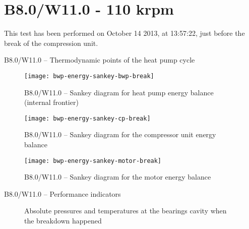 
\section{B8.0/W11.0 - 110 krpm}
\label{sec:bwp-exp-details-B8.0/W11.0}

This test has been performed on October 14\th{} 2013, at 13:57:22,
just before the break of the compression unit.

\begin{table}[htbp]
  \footnotesize
  \begin{center}
    
  \end{center}
  \caption{B8.0/W11.0 -- Thermodynamic points of the heat pump cycle}
  \label{tab:B8.0/W11.0-PThs}
\end{table}

\begin{figure}[htbp]
  \centering
  \texttt{[image: bwp-energy-sankey-bwp-break]}
  \caption{B8.0/W11.0 -- Sankey diagram for heat pump energy balance (internal frontier)}
  \label{fig:bwp-B8.0/W11.0-sankey-energy}
\end{figure}


\begin{figure}[htbp]
  \centering
  \texttt{[image: bwp-energy-sankey-cp-break]}
  \caption{B8.0/W11.0 -- Sankey diagram for the compressor unit energy balance}
  \label{fig:bwp-B8.0/W11.0-sankey-cp}
\end{figure}


\begin{figure}[htbp]
  \centering
  \texttt{[image: bwp-energy-sankey-motor-break]}
  \caption{B8.0/W11.0 -- Sankey diagram for the motor energy balance}
  \label{fig:bwp-B8.0/W11.0-sankey-motor}
\end{figure}

\begin{table}[htbp]
    \footnotesize
    \begin{center}
    
  \end{center}
  \caption{B8.0/W11.0 -- Performance indicators}
\end{table}

\begin{figure}[htbp]
  \centering
  \hspace{1em}
  \caption[Pressures and temperatures at the bearings cavity when the
  breakdown happened]{Absolute pressures and temperatures at the
    bearings cavity when the breakdown happened}
  \label{fig:bwp-bearings-P-T}
\end{figure}

